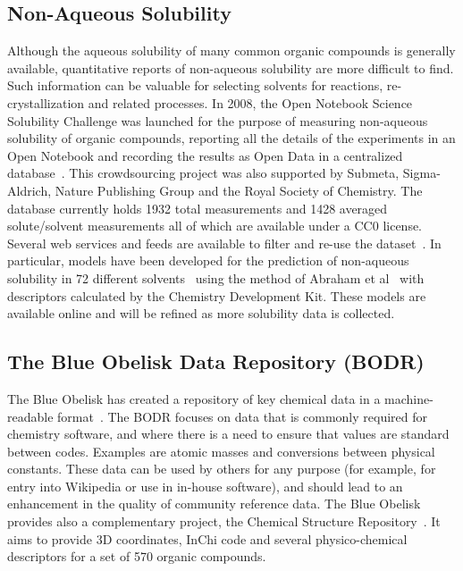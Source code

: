 \documentclass[10pt]{bmc_article}
\newenvironment{bmcformat}{\begin{raggedright}\baselineskip20pt\sloppy\setboolean{publ}{false}}{\end{raggedright}\baselineskip20pt\sloppy}
\begin{document}
\begin{bmcformat}
\subsection*{Non-Aqueous Solubility}

Although the aqueous solubility of many common organic compounds is
generally available, quantitative reports of non-aqueous solubility
are more difficult to find.
Such information can be valuable for selecting solvents for
reactions, re-crystallization and related processes. In 2008, the Open
Notebook Science Solubility Challenge was launched for the purpose of
measuring non-aqueous solubility of organic compounds, reporting all
the details of the experiments in an Open Notebook and recording the
results as Open Data in a centralized
database~\cite{ONS2010, BeautifulData_2009}.
This crowdsourcing project was also supported by Submeta,
Sigma-Aldrich, Nature Publishing Group and the Royal Society of
Chemistry. The database currently holds 1932 total measurements and
1428 averaged solute/solvent measurements all of which are available under
a CC0 license.  Several web services and
feeds are available to filter and re-use the dataset~\cite{SolubilityServices}.
In particular, models have been developed for the prediction of
non-aqueous solubility in 72 different
solvents~\cite{UCSolubilityPrediction}
using the method of Abraham et al~\cite{AbrahamSolubility} with
descriptors calculated by
the Chemistry Development Kit. These models are available online and
will be refined as more solubility data is collected.

\subsection*{The Blue Obelisk Data Repository (BODR)}

The Blue Obelisk has created a repository of key chemical
data in a machine-readable format~\cite{BODR}.
The BODR focuses on data that is commonly required for
chemistry software, and where there is a need to ensure that values
are standard between codes. Examples are atomic
masses and conversions between physical constants. These data
can be used by others for any purpose (for example, for entry into
Wikipedia or use in in-house software), and should lead
to an enhancement in the quality of community reference data.
The Blue Obelisk provides also a complementary project, the Chemical
Structure Repository~\cite{BODR}. It aims to provide 3D coordinates, InChi code and several
physico-chemical descriptors for a set of 570 organic compounds.


\end{bmcformat}
\end{document}
